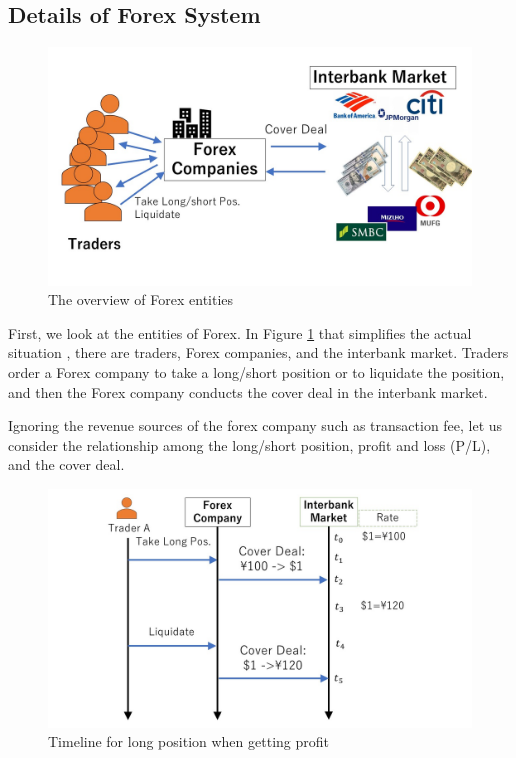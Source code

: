\subsection{Details of Forex System}
\label{sec:Forex}
\begin{figure}[htbp]
  \centering
  \includegraphics[scale=0.3]{./Figure/ForexEntity.jpg}
  \caption{The overview of Forex entities}
  \label{fig:entities}
\end{figure}
First, we look at the entities of Forex. In Figure \ref{fig:entities} that simplifies the actual situation \cite{bjr2016}, there are traders, Forex companies, and the interbank market. Traders order a Forex company to take a long/short position or to liquidate the position, and then the Forex company conducts the cover deal in the interbank market.

 Ignoring the revenue sources of the forex company such as transaction fee, let us consider the relationship among the long/short position, profit and loss (P/L), and the cover deal.

\begin{figure}
  \centering
  \includegraphics[scale=0.3]{./Figure/Long_CoverDeal1.jpg}
  \caption{Timeline for long position when getting profit}
  \label{fig:lcd1}
\end{figure}

